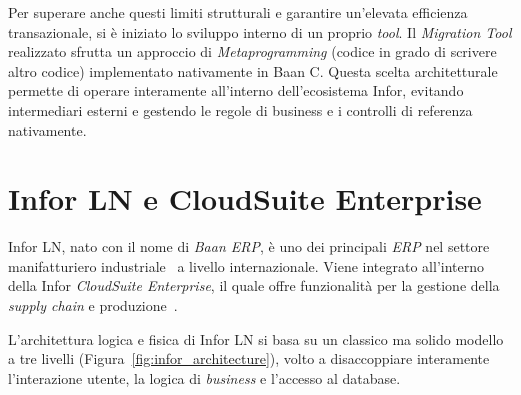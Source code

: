 Per superare anche questi limiti strutturali e garantire un'elevata efficienza transazionale, si è iniziato lo sviluppo interno di un proprio \textit{tool}.
Il \textit{Migration Tool} realizzato sfrutta un approccio di \textit{Metaprogramming} (codice in grado di scrivere altro codice) implementato nativamente in Baan C\@.
Questa scelta architetturale permette di operare interamente all'interno dell'ecosistema Infor, evitando intermediari esterni e
gestendo le regole di business e i controlli di referenza nativamente.

\section{Infor LN e CloudSuite Enterprise}\label{sec:infor-ln-e-cloudsuite-enterprise}
Infor LN, nato con il nome di \textit{Baan ERP}, è uno dei principali \textit{ERP} nel settore manifatturiero industriale~\cite{inforLN2025} a livello internazionale.
Viene integrato all'interno della Infor \textit{CloudSuite Enterprise}, il quale offre funzionalità per la gestione della \textit{supply chain}
e produzione~\cite{inforCloudsuite}.

L'architettura logica e fisica di Infor LN si basa su un classico ma solido modello a tre livelli (Figura~\ref{fig:infor_architecture}), 
volto a disaccoppiare interamente l'interazione utente, la logica di \textit{business} e l'accesso al database. 

